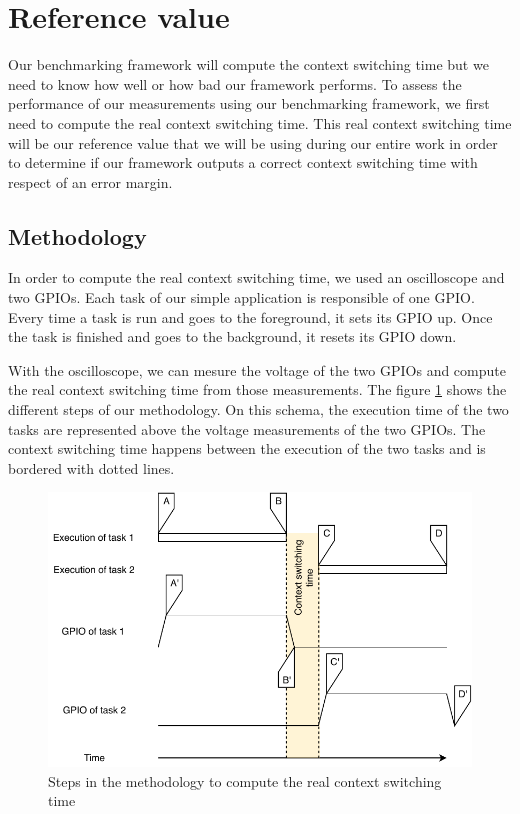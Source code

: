 \section{Reference value}

Our benchmarking framework will compute the context switching time but we need to know how well or how bad our framework performs.
To assess the performance of our measurements using our benchmarking framework, we first need to compute the real context switching time.
This real context switching time will be our reference value that we will be using during our entire work in order to determine if our framework outputs a correct context switching time with respect of an error margin.

\subsection{Methodology}

In order to compute the real context switching time, we used an oscilloscope and two GPIOs.
Each task of our simple application is responsible of one GPIO.
Every time a task is run and goes to the foreground, it sets its GPIO up.
Once the task is finished and goes to the background, it resets its GPIO down.

With the oscilloscope, we can mesure the voltage of the two GPIOs and compute the real context switching time from those measurements.
The figure \ref{fig:real-context-switching-time-measurement} shows the different steps of our methodology.
On this schema, the execution time of the two tasks are represented above the voltage measurements of the two GPIOs.
The context switching time happens between the execution of the two tasks and is bordered with dotted lines.

\begin{figure}[!ht]
  \centering
  \includegraphics[scale=1]{assets/real-context-switching-time-measurement.pdf}
  \caption{\label{fig:real-context-switching-time-measurement}Steps in the methodology to compute the real context switching time}
\end{figure}

